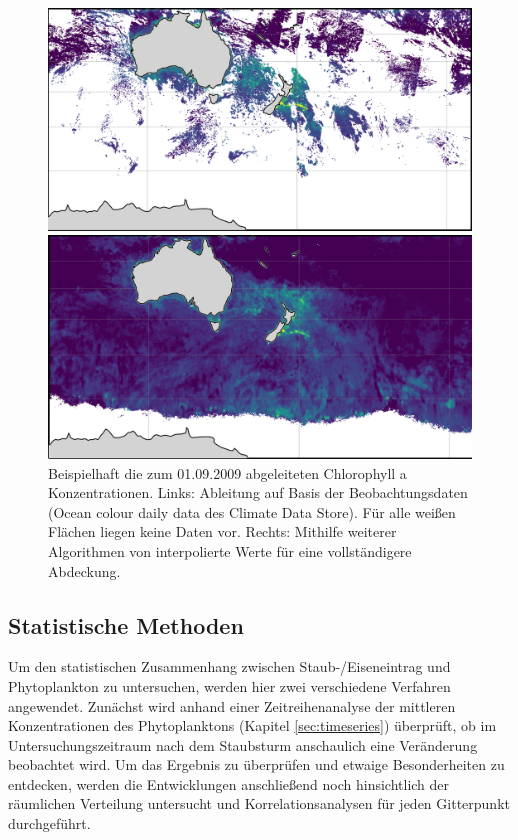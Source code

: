 \documentclass[12pt,a4paper,onecolumn,headheight=30pt]{scrartcl}
\begin{document}
\begin{figure}[htbp]
	\begin{minipage}[c]{0.49\textwidth}
		\includegraphics[width=\textwidth]{bilder/chla_raw.png}
	\end{minipage}\hfill
	\begin{minipage}[c]{0.49\textwidth}
		 \includegraphics[width=\textwidth]{bilder/chla_interpol.png}
	\end{minipage}\hfill
	\caption{Beispielhaft die zum 01.09.2009 abgeleiteten Chlorophyll a Konzentrationen. Links: Ableitung auf Basis der Beobachtungsdaten (Ocean colour daily data des Climate Data Store). Für alle weißen Flächen liegen keine Daten vor. Rechts: Mithilfe weiterer Algorithmen von \citet{Saulquin.2019} interpolierte Werte für eine vollständigere Abdeckung.} \label{fig:chla}
\end{figure}
\subsection{Statistische Methoden} \label{sec:stats}
Um den statistischen Zusammenhang zwischen Staub-/Eiseneintrag und Phytoplankton zu untersuchen, werden hier zwei verschiedene Verfahren angewendet. Zunächst wird anhand einer Zeitreihenanalyse der mittleren Konzentrationen des Phytoplanktons (Kapitel \ref{sec:timeseries}) überprüft, ob im Untersuchungszeitraum nach dem Staubsturm  anschaulich eine Veränderung beobachtet wird. Um das Ergebnis zu überprüfen und etwaige Besonderheiten zu entdecken, werden die Entwicklungen anschließend noch hinsichtlich der räumlichen Verteilung untersucht und Korrelationsanalysen für jeden Gitterpunkt durchgeführt.
\end{document}
